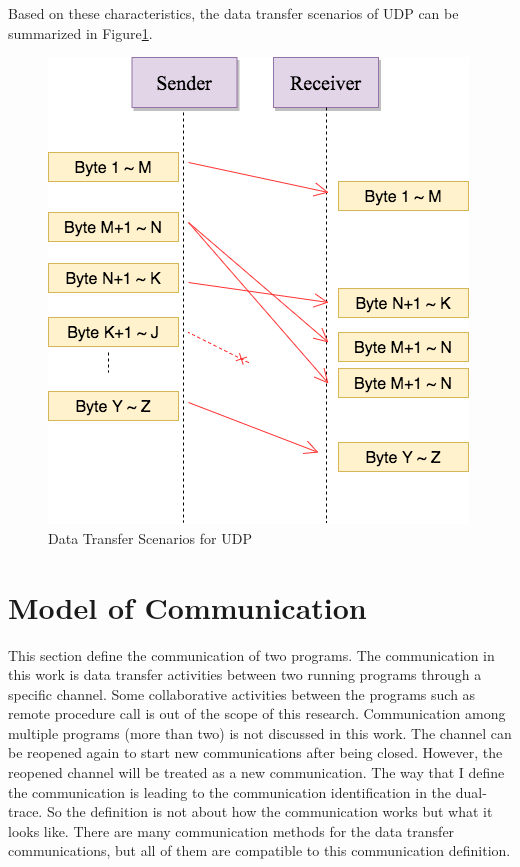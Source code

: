 Based on these characteristics, the data transfer scenarios of UDP can be summarized in Figure\ref{upd}.
\begin{figure}[H]
\centerline{\includegraphics[scale=0.48]{Figures/udp}}
 \caption{Data Transfer Scenarios for UDP}
\label{upd}
\end{figure}

\section{Model of Communication}\label{definition}
This section define the communication of two programs. The communication in this work is data transfer activities between two running programs through a specific channel. Some collaborative activities between the programs such as remote procedure call is out of the scope of this research. Communication among multiple programs (more than two) is not discussed in this work. The channel can be reopened again to start new communications after being closed. However, the reopened channel will be treated as a new communication. The way that I define the communication is leading to the communication identification in the dual-trace. So the definition is not about how the communication works but what it looks like. There are many communication methods for the data transfer communications, but all of them are compatible to this communication definition. 

